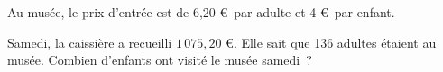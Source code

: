 \documentclass[exercice]{thedocument}%
\begin{document}
%
Au musée, le prix d'entrée est de 6,20 \euro\ par adulte et 4 \euro\ par
enfant.\par\noindent Samedi, la caissière a recueilli $1\,075,20$ \euro. Elle
sait que 136 adultes étaient au musée.\vskip5pt Combien d'enfants ont visité
le musée samedi~?
\end{document}
